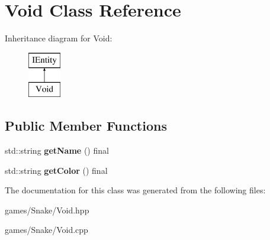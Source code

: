 \hypertarget{class_void}{}\section{Void Class Reference}
\label{class_void}
Inheritance diagram for Void\+:\begin{figure}[H]
\begin{center}
\leavevmode
\includegraphics[height=2.000000cm]{class_void}
\end{center}
\end{figure}
\subsection*{Public Member Functions}
\begin{DoxyCompactItemize}
\item 
\mbox{\label{class_void_ad3f67e2872db1519c236fdebd70a93f1}} 
std\+::string {\bfseries get\+Name} () final
\item 
\mbox{\label{class_void_a6bb6ca3e97942ea5d04a15e794ae3e4b}} 
std\+::string {\bfseries get\+Color} () final
\end{DoxyCompactItemize}


The documentation for this class was generated from the following files\+:\begin{DoxyCompactItemize}
\item 
games/\+Snake/Void.\+hpp\item 
games/\+Snake/Void.\+cpp\end{DoxyCompactItemize}
